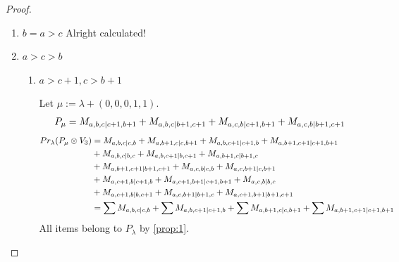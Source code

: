 \begin{proof}
\begin{enumerate}
\begin{enumerate}
\begin{table}[htbp]
\begin{tabular}{cc}
{}\\
 & \\
 $P_{c,c+2,c+1|c+1,c+2}$ & \makecell{
 $M_{c,c+3,c+2|c+3,c+2}$,
 $M_{c,c+2,c+3|c+2,c+3}$,
 $M_{c+3,c,c+2|c+3,c+2}$, \\
 $M_{c+2,c+3,c|c+3,c+2}$, 
 $M_{c+3,c+2,c|c+3,c+2}$,
 $M_{c+2,c,c+3|c+2,c+3}$
}\\
\bottomrule
\end{tabular}
\vspace{0.5em}
\parbox{\linewidth}{\small
\textbf{Interpretation:}
This table displays only selected computational results. This partial presentation does not affect our conclusion.
}
\end{table}

    \end{enumerate}
  \item $b=a>c$ Alright calculated!

  \item $a>c>b$
    \begin{enumerate}
      \item $a>c+1,c>b+1$\par
        Let $\mu:=\lambda + (0,0,0,1,1) $.
        \begin{equation}\notag
          \begin{aligned}
            P_\mu = M_{a,b,c|c+1,b+1}
+ M_{a,b,c|b+1,c+1}
+ M_{a,c,b|c+1,b+1}
+ M_{a,c,b|b+1,c+1}
          \end{aligned}
        \end{equation}
        \begin{equation}\notag
          \begin{aligned}
            Pr_{\lambda}(P_\mu \otimes V_{3}) &=
M_{a,b,c|c,b}
+ M_{a,b+1,c|c,b+1}
+ M_{a,b,c+1|c+1,b}
+ M_{a,b+1,c+1|c+1,b+1}\\
                                              &
+ M_{a,b,c|b,c}
+ M_{a,b,c+1|b,c+1}
+ M_{a,b+1,c|b+1,c}\\
                                              &
+ M_{a,b+1,c+1|b+1,c+1}
+ M_{a,c,b|c,b}
+ M_{a,c,b+1|c,b+1}\\
                                              &
+ M_{a,c+1,b|c+1,b}
+ M_{a,c+1,b+1|c+1,b+1}
+ M_{a,c,b|b,c}\\
                                              &
+ M_{a,c+1,b|b,c+1}
+ M_{a,c,b+1|b+1,c}
+ M_{a,c+1,b+1|b+1,c+1} \\
                                               &=
\sum M_{a,b,c|c,b}
+ \sum M_{a,b,c+1|c+1,b}
+ \sum M_{a,b+1,c|c,b+1}
+ \sum M_{a,b+1,c+1|c+1,b+1}
          \end{aligned}
        \end{equation}
All items belong to $P_\lambda$ by \cref{prop:1}.



\end{enumerate}
\end{enumerate}
\end{proof}

